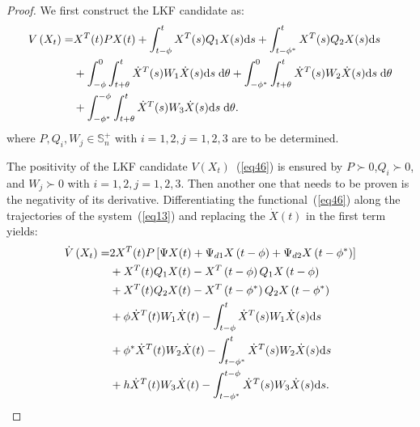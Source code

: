 \documentclass[a4paper]{cas-sc}
\newtheorem*{proof}{Proof}
\begin{document}
\begin{proof}
  We first construct the LKF candidate as:
  \begin{equation}
    \begin{aligned}
      V\left( {{X_t}} \right) = & {X^{T}}(t)PX(t) + \int_{t - \phi }^t {{X^{T}}} (s){Q_1}X(s){\text{d}}s + \int_{t - {\phi ^*}}^t {{X^{T}}} (s){Q_2}X(s){\text{d}}s \hfill                                                                                             \\
                                & + \int_{ - \phi }^0 {\int_{t + \theta }^t {{{\dot X}^{T}}} } (s){W_1}\dot X(s){\text{d}}s\;{\text{d}}\theta  + \int_{ - {\phi ^*}}^0 {\int_{t + \theta }^t {{{\dot X}^{T}}} } (s){W_2}\dot X(s){\text{d}}s\;{\text{d}}\theta  \hfill \\
                                & + \int_{ - {\phi ^*}}^{ - \phi } {\int_{t + \theta }^t {{{\dot X}^{T}}} } (s){W_3}\dot X(s){\text{d}}s\;{\text{d}}\theta . \hfill
    \end{aligned}
    \label{eq46}
  \end{equation}
  where $P,Q_i,W_j\in\mathbb{S}_n^+$ with $i=1,2,j=1,2,3$ are to be determined.

  The positivity of the LKF candidate $V\left(X_t\right)$~(\ref{eq46}) is ensured by $P\succ0$,$Q_i\succ0$, and $W_j\succ0$ with $i=1,2,j=1,2,3$. Then another one that needs to be proven is the negativity of its derivative. Differentiating the functional~(\ref{eq46}) along the trajectories of the system~(\ref{eq13}) and replacing the $\dot{X}(t)$ in the first term yields:
  \begin{equation}
    \begin{aligned}
      \dot V\left( {{X_t}} \right) = & 2{X^{T}}(t)P\left[ {\Psi X(t) + {\Psi _{d1}}X\left( {t - \phi } \right) + {\Psi _{d2}}X\left( {t - {\phi ^*}} \right)} \right] \hfill \\
                                     & + {X^{T}}(t){Q_1}X(t) - {X^{T}}\left( {t - \phi } \right){Q_1}X\left( {t - \phi } \right) \hfill                                      \\
                                     & + {X^{T}}(t){Q_2}X(t) - {X^{T}}\left( {t - {\phi ^*}} \right){Q_2}X\left( {t - {\phi ^*}} \right) \hfill                              \\
                                     & + \phi {{\dot X}^{T}}(t){W_1}\dot X(t) - \int_{t - \phi }^t {{{\dot X}^{T}}} (s){W_1}\dot X(s){\text{d}}s \hfill                      \\
                                     & + {\phi ^*}{{\dot X}^{T}}(t){W_2}\dot X(t) - \int_{t - {\phi ^*}}^t {{{\dot X}^{T}}} (s){W_2}\dot X(s){\text{d}}s \hfill              \\
                                     & + h{{\dot X}^{T}}(t){W_3}\dot X(t) - \int_{t - {\phi ^*}}^{t - \phi } {{{\dot X}^{T}}} (s){W_3}\dot X(s){\text{d}}s. \hfill           \\
    \end{aligned}
    \label{eq47}
  \end{equation}


\end{proof}
\end{document}
